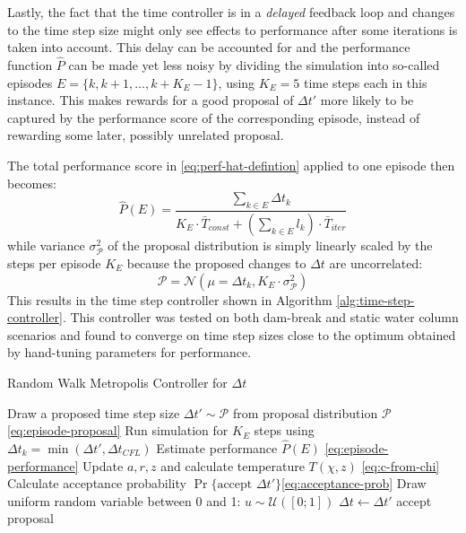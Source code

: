 \documentclass[oneside, a4paper]{book}
\newcommand\br[1]{\left(#1\right)}
\begin{document}
    Lastly, the fact that the time controller is in a \textit{delayed} feedback loop and changes to the time step size might only see effects to performance after some iterations is taken into account. This delay can be accounted for and the performance function $\hat{P}$ can be made yet less noisy by dividing the simulation into so-called episodes $E=\{k, k+1, \dots, k+K_{E}-1\}$, using  $K_{E}=5$ time steps each in this instance. This makes rewards for a good proposal of $\Delta t'$ more likely to be captured by the performance score of the corresponding episode, instead of rewarding some later, possibly unrelated proposal.
    
    The total performance score in \autoref{eq:perf-hat-defintion} applied to one episode then becomes:
    \begin{equation}\label{eq:episode-performance}
      \hat{P}\br{E} = \frac{
        \sum_{k\in E} \Delta t_k
      }{
        K_{E}\cdot \bar{T}_{const} + \br{\sum_{k\in E} l_k} \cdot \bar{T}_{iter}
      }
    \end{equation}
    while variance $\sigma^2_\mathcal{P}$ of the proposal distribution is simply linearly scaled by the steps per episode $K_E$ because the proposed changes to $\Delta t$ are uncorrelated:
    \begin{equation}\label{eq:episode-proposal}
      \mathcal{P} = \mathcal{N}\br{\mu = \Delta t_k, K_{E}\cdot\sigma^2_\mathcal{P}}
    \end{equation}
    This results in the time step controller shown in Algorithm \ref{alg:time-step-controller}. This controller was tested on both dam-break and static water column scenarios and found to converge on time step sizes close to the optimum obtained by hand-tuning parameters for performance.

    
    \begin{algorithm}
      \caption{Random Walk Metropolis Controller for $\Delta t$}
      \label{alg:time-step-controller}
      \begin{algorithmic}[1]
          \State Draw a proposed time step size $\Delta t' \sim \mathcal{P}$ from proposal distribution $\mathcal{P}$ \Comment\autoref{eq:episode-proposal}
          \State Run simulation for $K_E$ steps using $\Delta t_k=\min\br{\Delta t', \Delta t_{CFL}}$
          \State Estimate performance $\hat{P}\br{E}$ \Comment\autoref{eq:episode-performance}
          \State Update $a,r,z$ and calculate temperature $T\br{\chi,z}$ \Comment\autoref{eq:c-from-chi}
          \State Calculate acceptance probability $\Pr\{\text{accept }\Delta t'\}$\Comment\autoref{eq:acceptance-prob}
          \State Draw uniform random variable between 0 and 1: $u\sim\mathcal{U}\br{[0;1]}$
            \State $\Delta t \gets \Delta t'$ \Comment accept proposal
          \EndIf 
        \EndFor
      
      \end{algorithmic}
    \end{algorithm}
\end{document}
